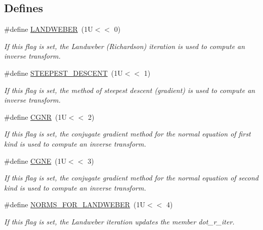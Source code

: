\subsection*{Defines}
\begin{CompactItemize}
\item 
\#define \hyperlink{group__solver_g84bae5d48296d5a0d1e548ed58b9e495}{LANDWEBER}~(1U$<$$<$ 0)
\begin{CompactList}\small\item\em If this flag is set, the Landweber (Richardson) iteration is used to compute an inverse transform. \item\end{CompactList}\item 
\#define \hyperlink{group__solver_g1f016d06d661c80eacb5182d80813cd9}{STEEPEST\_\-DESCENT}~(1U$<$$<$ 1)
\begin{CompactList}\small\item\em If this flag is set, the method of steepest descent (gradient) is used to compute an inverse transform. \item\end{CompactList}\item 
\#define \hyperlink{group__solver_g5716b96b5141dfb52b747a78b11defa7}{CGNR}~(1U$<$$<$ 2)
\begin{CompactList}\small\item\em If this flag is set, the conjugate gradient method for the normal equation of first kind is used to compute an inverse transform. \item\end{CompactList}\item 
\#define \hyperlink{group__solver_gae8290aa6a83fd56699a98cc0a55baf5}{CGNE}~(1U$<$$<$ 3)
\begin{CompactList}\small\item\em If this flag is set, the conjugate gradient method for the normal equation of second kind is used to compute an inverse transform. \item\end{CompactList}\item 
\#define \hyperlink{group__solver_g6be0dda24e7cbd9f3f1d1b299e815973}{NORMS\_\-FOR\_\-LANDWEBER}~(1U$<$$<$ 4)
\begin{CompactList}\small\item\em If this flag is set, the Landweber iteration updates the member dot\_\-r\_\-iter. \item\end{CompactList}\item 
$$
\end{CompactItemize}
